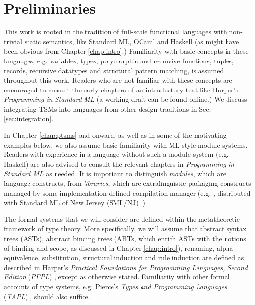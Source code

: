 
\section{Preliminaries}\label{sec:preliminaries}
\vspace{-3px}
This work is rooted in the tradition of full-scale functional languages with non-trivial static semantics, like Standard ML, OCaml and Haskell (as might have been obvious from Chapter \ref{chap:intro}.) Familiarity with basic concepts in these languages, e.g. variables, types, polymorphic and recursive functions, tuples, records, recursive datatypes and structural pattern matching, is assumed throughout this work. Readers who are not familiar with these concepts are encouraged to consult the early chapters of an introductory text like Harper's \emph{Programming in Standard ML} \cite{harper1997programming} (a working draft can be found online.) We discuss integrating TSMs into languages from other design traditions in Sec. \ref{sec:integration}.

In Chapter \ref{chap:ptsms} and onward, as well as in some of the motivating examples below, we also assume basic familiarity with ML-style module systems. Readers with experience in a language without such a module system (e.g. Haskell) are also advised to consult the relevant chapters in \emph{Programming in Standard ML} \cite{harper1997programming} as needed. It is important to  distinguish \emph{modules}, which are language constructs, from \emph{libraries}, which are extralinguistic packaging constructs managed by some implementation-defined compilation manager (e.g. , distributed with Standard ML of New Jersey (SML/NJ) \cite{DBLP:conf/plilp/AppelM91}.)

The formal systems that we will consider are defined within the metatheoretic framework of type theory. More specifically, we will assume that abstract syntax trees (ASTs), abstract binding trees (ABTs, which enrich ASTs with the notions of binding and scope, as discussed in Chapter \ref{chap:intro}), renaming, alpha-equivalence, substitution, structural induction and rule induction are defined as described in Harper's \emph{Practical Foundations for Programming Languages, Second Edition} (\emph{PFPL}) \cite{pfpl}, except as otherwise stated. Familiarity with other formal accounts of type systems, e.g. Pierce's \emph{Types and Programming Languages} (\emph{TAPL}) \cite{tapl}, should also suffice.%

